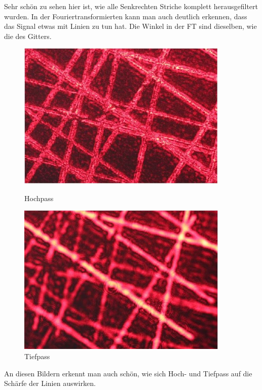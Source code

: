 Sehr schön zu sehen hier ist, wie alle Senkrechten Striche komplett herausgefiltert wurden.
In der Fouriertransformierten kann man auch deutlich erkennen, dass das Signal etwas mit Linien zu tun hat. Die Winkel in der FT sind dieselben, wie die des Gitters.
                \begin{figure}[H]
                  \begin{minipage}{0.45\textwidth}
                   \centering
                    \includegraphics[width=0.9\textwidth]{Abb/Abb_6.JPG}
                    \caption{Hochpass}
                  \end{minipage}\hfill
                  \begin{minipage}{0.45\textwidth}
                   \centering
                    \includegraphics[width=0.9\textwidth]{Abb/Abb_7.JPG}
                    \caption{Tiefpass}
                  \end{minipage}
                \end{figure}
An diesen Bildern erkennt man auch schön, wie sich Hoch- und Tiefpass auf die Schärfe der Linien auswirken. 


